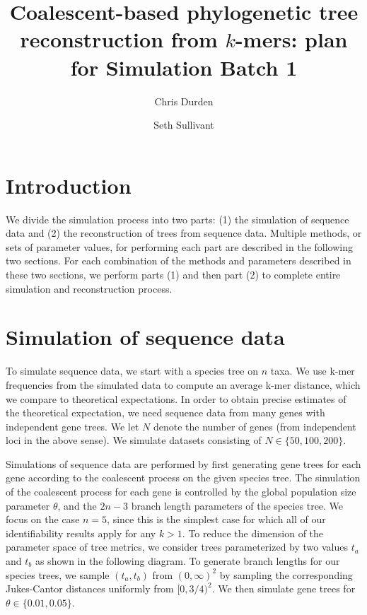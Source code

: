 \documentclass[12pt]{article}
\title{Coalescent-based phylogenetic tree reconstruction from $k$-mers: plan for Simulation Batch 1}
\author{Chris Durden}
\author{Seth Sullivant}
\affil{Department of Mathematics, North Carolina State University}
\theoremstyle{definition}
\begin{document}
\maketitle

\section{Introduction}
We divide the simulation process into two parts: (1) the simulation of sequence data and (2) the reconstruction of trees from sequence data. Multiple methods, or sets of parameter values, for performing each part are described in the following two sections. For each combination of the methods and parameters described in these two sections, we perform parts (1) and then part (2) to complete entire simulation and reconstruction process.

\section{Simulation of sequence data}

To simulate sequence data, we start with a species tree on $n$ taxa.
We use k-mer frequencies from the simulated data to compute an average k-mer distance, which we compare to theoretical expectations.
In order to obtain precise estimates of the theoretical expectation, we need sequence data from many genes with independent gene trees.
We let $N$ denote the number of genes (from independent loci in the above sense).
We simulate datasets consisting of $N \in \{50,100,200\}$.

Simulations of sequence data are performed by first generating gene trees for each gene according to the coalescent process on the given species tree. 
The simulation of the coalescent process for each gene is controlled by the global population size parameter $\theta$, and the $2n-3$ branch length parameters of the species tree.
We focus on the case $n=5$, since this is the simplest case for which all of our identifiability results apply for any $k>1$.
To reduce the dimension of the parameter space of tree metrics, we consider trees parameterized by two values $t_a$ and $t_b$ as shown in the following diagram. To generate branch lengths for our species trees, we sample $(t_a,t_b)$ from $(0,\infty)^2$ by sampling the corresponding Jukes-Cantor distances uniformly from $[0,3/4)^2$. We then simulate gene trees for $\theta \in \{0.01, 0.05\}$.
\end{document}
